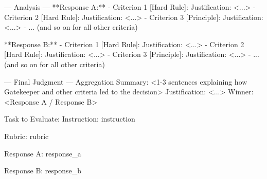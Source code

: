 \begin{table}[t]
\begin{tcblisting}
--- Analysis ---
**Response A:**
- Criterion 1 [Hard Rule]: Justification: <...>
- Criterion 2 [Hard Rule]: Justification: <...>
- Criterion 3 [Principle]: Justification: <...>
- ... (and so on for all other criteria)

**Response B:**
- Criterion 1 [Hard Rule]: Justification: <...>
- Criterion 2 [Hard Rule]: Justification: <...>
- Criterion 3 [Principle]: Justification: <...>
- ... (and so on for all other criteria)

--- Final Judgment ---
Aggregation Summary: <1-3 sentences explaining how Gatekeeper and other criteria led to the decision>
Justification: <...>
Winner: <Response A / Response B>


Task to Evaluate:
Instruction:
{instruction}

Rubric:
{rubric}

Response A:
{response_a}

Response B:
{response_b}
\end{tcblisting}
\end{table}
